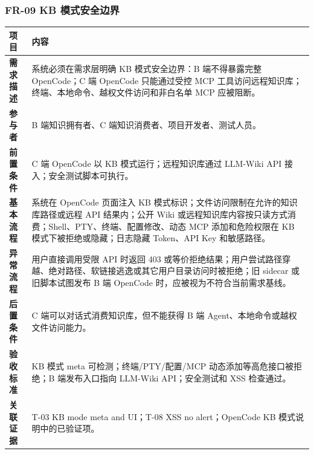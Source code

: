 \documentclass[UTF8,a4paper,12pt,fontset=fandol]{ctexart}
\newcommand{\code}[1]{\texorpdfstring{\begingroup\footnotesize\detokenize{#1}\endgroup}{#1}}
\begin{document}
\subsubsection{FR-09 KB 模式安全边界}
\begin{longtable}{>{\bfseries}p{2.4cm}p{11.8cm}}
\toprule
项目 & 内容 \\
\midrule
需求描述 & 系统必须在需求层明确 KB 模式安全边界：B 端不得暴露完整 OpenCode；C 端 OpenCode 只能通过受控 \code{llm_wiki_*} MCP 工具访问远程知识库；终端、本地命令、越权文件访问和非白名单 MCP 应被阻断。 \\
参与者 & B 端知识拥有者、C 端知识消费者、项目开发者、测试人员。 \\
前置条件 & C 端 OpenCode 以 KB 模式运行；远程知识库通过 LLM-Wiki API 接入；安全测试脚本可执行。 \\
基本流程 & 系统在 OpenCode 页面注入 KB 模式标识；文件访问限制在允许的知识库路径或远程 API 结果内；公开 Wiki 或远程知识库内容按只读方式消费；Shell、PTY、终端、配置修改、动态 MCP 添加和危险权限在 KB 模式下被拒绝或隐藏；日志隐藏 Token、API Key 和敏感路径。 \\
异常流程 & 用户直接调用受限 API 时返回 403 或等价拒绝结果；用户尝试路径穿越、绝对路径、软链接逃逸或其它用户目录访问时被拒绝；旧 sidecar 或旧脚本试图发布 B 端 OpenCode 时，应被视为不符合当前需求基线。 \\
后置条件 & C 端可以对话式消费知识库，但不能获得 B 端 Agent、本地命令或越权文件访问能力。 \\
验收标准 & KB 模式 meta 可检测；终端/PTY/配置/MCP 动态添加等高危接口被拒绝；B 端发布入口指向 LLM-Wiki API；安全测试和 XSS 检查通过。 \\
关联证据 & T-03 KB mode meta and UI；T-08 XSS no alert；OpenCode KB 模式说明中的已验证项。 \\
\bottomrule
\end{longtable}
\end{document}
